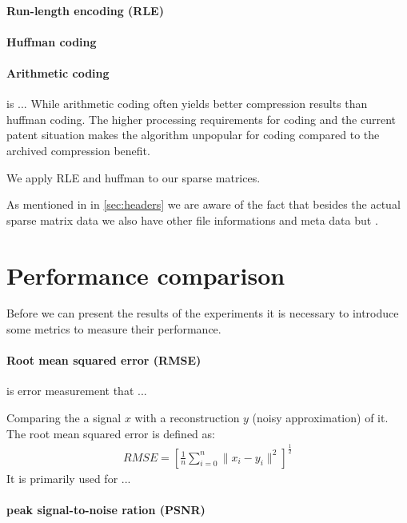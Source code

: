\paragraph{Run-length encoding (RLE)}
\paragraph{Huffman coding}
\paragraph{Arithmetic coding} is ...
While arithmetic coding often yields better compression results than huffman
coding. The higher processing requirements for coding and the current patent
situation makes the algorithm unpopular for coding compared to the archived
compression benefit.

We apply RLE and huffman to our sparse matrices. 


As mentioned in in \ref{sec:headers} we are aware of the fact that besides
the actual sparse matrix data we also have other file informations and meta
data but .  

\section{Performance comparison}

Before we can present the results of the experiments it is necessary to
introduce some metrics to measure their performance.


\paragraph{Root mean squared error (RMSE)} is error measurement that ...

Comparing the a signal $x$ with a reconstruction $y$ (noisy approximation) of
it. The root mean squared error is defined as:
\begin{align}
 RMSE = \left[\frac{1}{n} \sum_{i=0}^{n}{\lVert x_i - y_i\rVert^{2}}
\right]^{\frac{1}{2}}
\end{align}
It is primarily used for ...

\paragraph{peak signal-to-noise ration (PSNR)}

